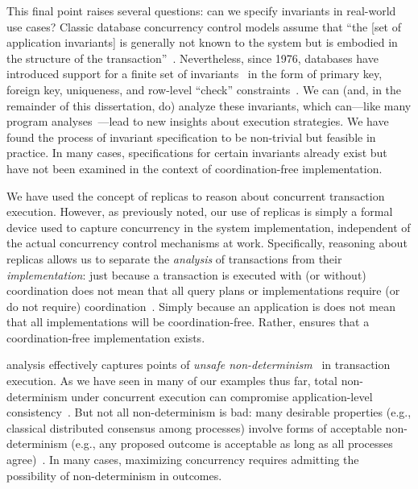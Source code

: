 This final point raises several questions: can we specify invariants
in real-world use cases? Classic database concurrency control models
assume that ``the [set of application invariants] is generally not
known to the system but is embodied in the structure of the
transaction''~\cite{traiger-tods,eswaran-consistency}. Nevertheless,
since 1976, databases have introduced support for a finite set of
invariants~\cite{korth-serializability,decomp-semantics,garciamolina-semantics,ic-survey,ic-survey-two}
in the form of primary key, foreign key, uniqueness, and row-level
``check'' constraints~\cite{kemme-si-ic}. We can (and, in the
remainder of this dissertation, do) analyze these invariants, which
can---like many program analyses~\cite{kohler-commutativity}---lead to
new insights about execution strategies. We have found the process of
invariant specification to be non-trivial but feasible in practice. In
many cases, specifications for certain invariants already exist but have not
been examined in the context of coordination-free implementation.

 We have used the concept
of replicas to reason about concurrent transaction execution. However,
as previously noted, our use of replicas is simply a formal device
used to capture concurrency in the system implementation, independent
of the actual concurrency control mechanisms at work. Specifically,
reasoning about replicas allows us to separate the \textit{analysis}
of transactions from their \textit{implementation}: just because a
transaction is executed with (or without) coordination does not mean
that all query plans or implementations require (or do not require)
coordination~\cite{hat-vldb}. Simply because an application is
\iconfluent does not mean that all implementations will be
coordination-free. Rather, \iconfluence ensures that a
coordination-free implementation exists.

 \Iconfluence analysis effectively
captures points of \textit{unsafe
  non-determinism}~\cite{consistency-borders} in transaction
execution. As we have seen in many of our examples thus far, total
non-determinism under concurrent execution can compromise
application-level consistency~\cite{calm,termrewriting}. But not all
non-determinism is bad: many desirable properties (e.g., classical
distributed consensus among processes) involve forms of acceptable
non-determinism (e.g., any proposed outcome is acceptable as long as
all processes agree)~\cite{paxos-commit}. In many cases, maximizing
concurrency requires admitting the possibility of non-determinism in
outcomes.

